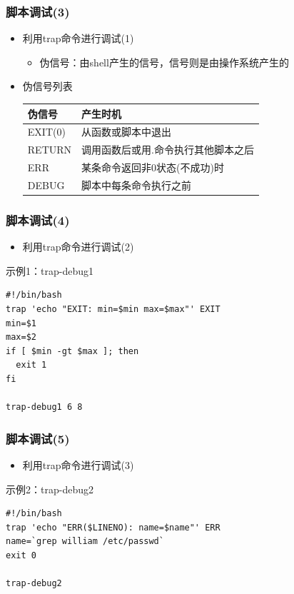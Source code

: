 \documentclass[xcolor=svgnames,presentation]{beamer}
\begin{document}
\begin{frame}
\frametitle{脚本调试(3)}
\label{sec-1-3-26}
\begin{itemize}

\item 利用trap命令进行调试(1)
\label{sec-1-3-26-1}%
\begin{itemize}

\item 伪信号：由shell产生的信号，信号则是由操作系统产生的
\label{sec-1-3-26-1-1}%
\end{itemize} %

\item 伪信号列表\\
\label{sec-1-3-26-2}%
\begin{center}
\begin{tabular}{ll}
 伪信号   &  产生时机                             \\
\hline
 EXIT(0)  &  从函数或脚本中退出                   \\
 RETURN   &  调用函数后或用.命令执行其他脚本之后  \\
 ERR      &  某条命令返回非0状态(不成功)时        \\
 DEBUG    &  脚本中每条命令执行之前               \\
\end{tabular}
\end{center}


\end{itemize} %
\end{frame}
\begin{frame}[fragile]
\frametitle{脚本调试(4)}
\label{sec-1-3-27}
\begin{itemize}

\item 利用trap命令进行调试(2)
\label{sec-1-3-27-1}%
\end{itemize} %
\begin{exampleblock}{示例1：trap-debug1}
\label{sec-1-3-27-2}


\begin{verbatim}
#!/bin/bash
trap 'echo "EXIT: min=$min max=$max"' EXIT
min=$1
max=$2
if [ $min -gt $max ]; then
  exit 1
fi

trap-debug1 6 8
\end{verbatim}
\end{exampleblock}
\end{frame}
\begin{frame}[fragile]
\frametitle{脚本调试(5)}
\label{sec-1-3-28}
\begin{itemize}

\item 利用trap命令进行调试(3)
\label{sec-1-3-28-1}%
\end{itemize} %
\begin{exampleblock}{示例2：trap-debug2}
\label{sec-1-3-28-2}


\begin{verbatim}
#!/bin/bash
trap 'echo "ERR($LINENO): name=$name"' ERR
name=`grep william /etc/passwd`
exit 0

trap-debug2
\end{verbatim}
\end{exampleblock}
\end{frame}
\end{document}
